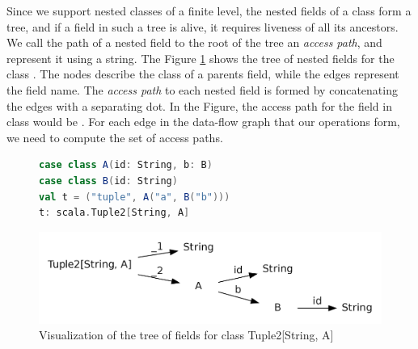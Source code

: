 Since we support nested classes of a finite level, the nested fields of a class
form a tree, and if a field in such a tree is alive, it requires liveness of all
its ancestors. We call the path of a nested field to the root of the tree an
\emph{access path}, and represent it using a string. The Figure
\ref{fig:type_tree} shows the tree of nested fields for the class
. The nodes describe the class of a parents field, while
the edges represent the field name. The \emph{access path} to each nested field is formed by
concatenating the edges with a separating dot. In the Figure, the access path
for the field  in class  would be . For each edge
in the data-flow graph that our operations form, we need to compute the set of
access paths.

\begin{figure}[b]
\begin{lstlisting}[language=Scala,name=code]
case class A(id: String, b: B)
case class B(id: String)  
val t = ("tuple", A("a", B("b"))) 
t: scala.Tuple2[String, A]
\end{lstlisting}
\centering
\includegraphics[clip=true, width=0.95\columnwidth]{dot/access.png}
\caption{Visualization of the tree of fields for class Tuple2[String, A]}
\label{fig:type_tree}
\end{figure}

